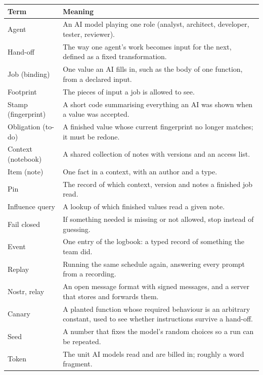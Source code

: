 \documentclass[10pt,a4paper]{article}
\begin{document}
\begin{table}[h]
\centering\small
\begin{tabularx}{\textwidth}{@{}l X@{}}
\toprule
Term & Meaning \\
\midrule
Agent & An AI model playing one role (analyst, architect, developer, tester, reviewer). \\
Hand-off & The way one agent's work becomes input for the next, defined as a fixed transformation. \\
Job (binding) & One value an AI fills in, such as the body of one function, from a declared input. \\
Footprint & The pieces of input a job is allowed to see. \\
Stamp (fingerprint) & A short code summarising everything an AI was shown when a value was accepted. \\
Obligation (to-do) & A finished value whose current fingerprint no longer matches; it must be redone. \\
Context (notebook) & A shared collection of notes with versions and an access list. \\
Item (note) & One fact in a context, with an author and a type. \\
Pin & The record of which context, version and notes a finished job read. \\
Influence query & A lookup of which finished values read a given note. \\
Fail closed & If something needed is missing or not allowed, stop instead of guessing. \\
Event & One entry of the logbook: a typed record of something the team did. \\
Replay & Running the same schedule again, answering every prompt from a recording. \\
Nostr, relay & An open message format with signed messages, and a server that stores and forwards them. \\
Canary & A planted function whose required behaviour is an arbitrary constant, used to see whether instructions
survive a hand-off. \\
Seed & A number that fixes the model's random choices so a run can be repeated. \\
Token & The unit AI models read and are billed in; roughly a word fragment. \\
\bottomrule
\end{tabularx}
\end{table}
\end{document}
